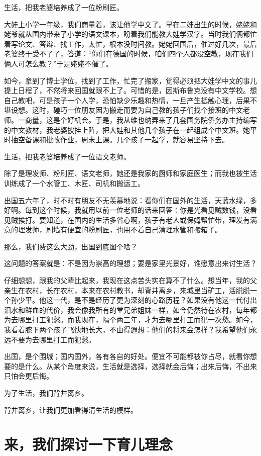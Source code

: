 \documentclass[twoside,openright,headings=optiontohead]{ctexbook} %
\begin{document}
{生活，把我老婆培养成了一位粉刷匠。

大娃上小学一年级，我们商量着，该让他学中文了。早在二娃出生的时候，姥姥和姥爷就从国内带来了小学的语文课本，盼着我们能教大娃学汉字。当时我们俩都忙着写论文、答辩、找工作，太忙，根本没时间教。姥姥回国后，催过好几次，最后老婆终于受不了了，答道：``你们在德国的时候，咱们四个人都没空教，现在我们俩人可怎么教？''于是姥姥不催了。

如今，拿到了博士学位，找到了工作，忙完了搬家，觉得必须把大娃学中文的事儿提上日程了，不然将来回国就跟不上了。可惜的是，因斯布鲁克没有中文学校。想自己教吧，可是孩子一个人学，恐怕缺少乐趣和热情，一旦产生抵触心理，后果不堪设想。这时，碰巧一位朋友因为搬走而要为自己教的孩子们找个接班的中文老师。一商量，这是个好机会。于是，我从维也纳弄来了几套国务院侨务办主持编写的中文教材，我老婆披挂上阵，把大娃和其他几个孩子在一起组成个中文班。她平时抽空备课和批改作业，周末上课。几个孩子一起学，就容易坚持下去。

生活，把我老婆培养成了一位语文老师。

除了是理发师、粉刷匠、语文老师，她还是我家的厨师和家庭医生；而我也被生活训练成了一个水管工、木匠、司机和搬运工。

出国五六年了，时不时有朋友不无羡慕地说：看你们在国外的生活，天蓝水绿，多好啊。每到这个时候，我就用以前一位老师的话来回答：你是光看见贼数钱，没看见贼挨打。要知道，在国内的生活多省心啊，孩子有老人或保姆帮忙带，理发有满意的理发师，刷墙有便宜的粉刷匠，也用不着自己清理水管和搬箱子。

那么，我们费这么大劲，出国到底图个啥？

这问题的答案就是：不是因为崇高的理想；要是家里光景好，谁愿意出来讨生活？

仔细想想，跟我的父辈比起来，我现在这点苦头实在算不了什么。想当年，我的父亲生在农村，长在农村，本来在农村教书，却背井离乡，来城里当矿工，活脱脱一个孙少平。他这一代，是不是经历了更为深刻的心路历程？如果没有他这一代付出泪水和鲜血的代价，我会像我所有的堂兄弟姐妹一样，如今仍然待在农村，每年都为去哪里打工犯愁。而我现在，隔个两三年，才为去哪里打工而犯一次愁。如今，我看着膝下两个孩子飞快地长大，不由得遐想：他们的将来会怎样？我希望他们永远不要为去哪里打工而犯愁。

出国，是个围城；国内国外，各有各自的好处。便宜不可能都被你占尽，就看你想要的是什么。从某个角度来说，生活就是选择，选择就会后悔；出来后悔，不出来只怕会更后悔。

为了生活，我们背井离乡。

背井离乡，让我们更加看得清生活的模样。

\chapter*{来，我们探讨一下育儿理念}\label{kid-edu}

}
\end{document}
